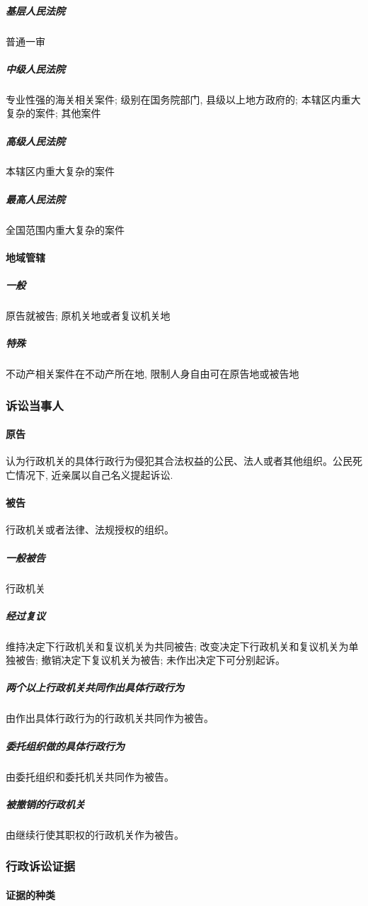 \subparagraph{基层人民法院} 普通一审

\subparagraph{中级人民法院} 专业性强的海关相关案件; 级别在国务院部门, 县级以上地方政府的; 本辖区内重大复杂的案件; 其他案件

\subparagraph{高级人民法院} 本辖区内重大复杂的案件

\subparagraph{最高人民法院} 全国范围内重大复杂的案件

\paragraph{地域管辖}

\subparagraph{一般} 原告就被告; 原机关地或者复议机关地 

\subparagraph{特殊} 不动产相关案件在不动产所在地, 限制人身自由可在原告地或被告地

\subsubsection{诉讼当事人}

\paragraph{原告} 认为行政机关的具体行政行为侵犯其合法权益的公民、法人或者其他组织。公民死亡情况下, 近亲属以自己名义提起诉讼.

\paragraph{被告} 行政机关或者法律、法规授权的组织。

\subparagraph{一般被告} 行政机关

\subparagraph{经过复议} 维持决定下行政机关和复议机关为共同被告; 改变决定下行政机关和复议机关为单独被告; 撤销决定下复议机关为被告; 未作出决定下可分别起诉。

\subparagraph{两个以上行政机关共同作出具体行政行为} 由作出具体行政行为的行政机关共同作为被告。

\subparagraph{委托组织做的具体行政行为} 由委托组织和委托机关共同作为被告。

\subparagraph{被撤销的行政机关} 由继续行使其职权的行政机关作为被告。

\subsubsection{行政诉讼证据} 

\paragraph{证据的种类}

